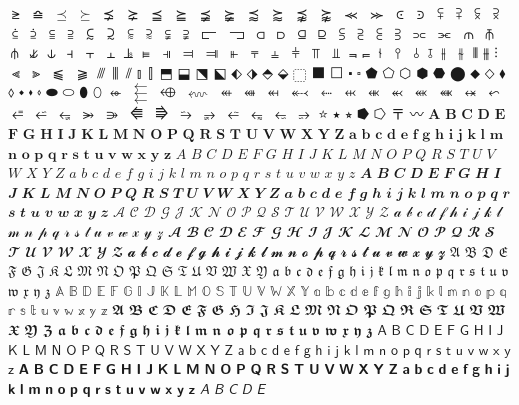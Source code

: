 $⪭$
$⪮$
$⪯$
$⪰$
$⪱$
$⪲$
$⪳$
$⪴$
$⪵$
$⪶$
$⪷$
$⪸$
$⪹$
$⪺$
$⪻$
$⪼$
$⪽$
$⪾$
$⪿$
$⫀$
$⫁$
$⫂$
$⫃$
$⫄$
$⫅$
$⫆$
$⫇$
$⫈$
$⫉$
$⫊$
$⫋$
$⫌$
$⫍$
$⫎$
$⫏$
$⫐$
$⫑$
$⫒$
$⫓$
$⫔$
$⫕$
$⫖$
$⫗$
$⫘$
$⫙$
$⫚$
$⫛$
$⫝̸$
$⫝$
$⫞$
$⫟$
$⫠$
$⫡$
$⫢$
$⫣$
$⫤$
$⫥$
$⫦$
$⫧$
$⫨$
$⫩$
$⫪$
$⫫$
$⫬$
$⫭$
$⫮$
$⫯$
$⫰$
$⫱$
$⫲$
$⫳$
$⫴$
$⫵$
$⫶$
$⫷$
$⫸$
$⫹$
$⫺$
$⫻$
$⫼$
$⫽$
$⫾$
$⫿$
$⬒$
$⬓$
$⬔$
$⬕$
$⬖$
$⬗$
$⬘$
$⬙$
$⬚$
$⬛$
$⬜$
$⬝$
$⬞$
$⬟$
$⬠$
$⬡$
$⬢$
$⬣$
$⬤$
$⬥$
$⬦$
$⬧$
$⬨$
$⬩$
$⬪$
$⬫$
$⬬$
$⬭$
$⬮$
$⬯$
$⬰$
$⬱$
$⬲$
$⬳$
$⬴$
$⬵$
$⬶$
$⬷$
$⬸$
$⬹$
$⬺$
$⬻$
$⬼$
$⬽$
$⬾$
$⬿$
$⭀$
$⭁$
$⭂$
$⭃$
$⭄$
$⭅$
$⭆$
$⭇$
$⭈$
$⭉$
$⭊$
$⭋$
$⭌$
$⭐$
$⭑$
$⭒$
$⭓$
$⭔$
$〒$
$〰$
$𝐀$
$𝐁$
$𝐂$
$𝐃$
$𝐄$
$𝐅$
$𝐆$
$𝐇$
$𝐈$
$𝐉$
$𝐊$
$𝐋$
$𝐌$
$𝐍$
$𝐎$
$𝐏$
$𝐐$
$𝐑$
$𝐒$
$𝐓$
$𝐔$
$𝐕$
$𝐖$
$𝐗$
$𝐘$
$𝐙$
$𝐚$
$𝐛$
$𝐜$
$𝐝$
$𝐞$
$𝐟$
$𝐠$
$𝐡$
$𝐢$
$𝐣$
$𝐤$
$𝐥$
$𝐦$
$𝐧$
$𝐨$
$𝐩$
$𝐪$
$𝐫$
$𝐬$
$𝐭$
$𝐮$
$𝐯$
$𝐰$
$𝐱$
$𝐲$
$𝐳$
$𝐴$
$𝐵$
$𝐶$
$𝐷$
$𝐸$
$𝐹$
$𝐺$
$𝐻$
$𝐼$
$𝐽$
$𝐾$
$𝐿$
$𝑀$
$𝑁$
$𝑂$
$𝑃$
$𝑄$
$𝑅$
$𝑆$
$𝑇$
$𝑈$
$𝑉$
$𝑊$
$𝑋$
$𝑌$
$𝑍$
$𝑎$
$𝑏$
$𝑐$
$𝑑$
$𝑒$
$𝑓$
$𝑔$
$𝑖$
$𝑗$
$𝑘$
$𝑙$
$𝑚$
$𝑛$
$𝑜$
$𝑝$
$𝑞$
$𝑟$
$𝑠$
$𝑡$
$𝑢$
$𝑣$
$𝑤$
$𝑥$
$𝑦$
$𝑧$
$𝑨$
$𝑩$
$𝑪$
$𝑫$
$𝑬$
$𝑭$
$𝑮$
$𝑯$
$𝑰$
$𝑱$
$𝑲$
$𝑳$
$𝑴$
$𝑵$
$𝑶$
$𝑷$
$𝑸$
$𝑹$
$𝑺$
$𝑻$
$𝑼$
$𝑽$
$𝑾$
$𝑿$
$𝒀$
$𝒁$
$𝒂$
$𝒃$
$𝒄$
$𝒅$
$𝒆$
$𝒇$
$𝒈$
$𝒉$
$𝒊$
$𝒋$
$𝒌$
$𝒍$
$𝒎$
$𝒏$
$𝒐$
$𝒑$
$𝒒$
$𝒓$
$𝒔$
$𝒕$
$𝒖$
$𝒗$
$𝒘$
$𝒙$
$𝒚$
$𝒛$
$𝒜$
$𝒞$
$𝒟$
$𝒢$
$𝒥$
$𝒦$
$𝒩$
$𝒪$
$𝒫$
$𝒬$
$𝒮$
$𝒯$
$𝒰$
$𝒱$
$𝒲$
$𝒳$
$𝒴$
$𝒵$
$𝒶$
$𝒷$
$𝒸$
$𝒹$
$𝒻$
$𝒽$
$𝒾$
$𝒿$
$𝓀$
$𝓁$
$𝓂$
$𝓃$
$𝓅$
$𝓆$
$𝓇$
$𝓈$
$𝓉$
$𝓊$
$𝓋$
$𝓌$
$𝓍$
$𝓎$
$𝓏$
$𝓐$
$𝓑$
$𝓒$
$𝓓$
$𝓔$
$𝓕$
$𝓖$
$𝓗$
$𝓘$
$𝓙$
$𝓚$
$𝓛$
$𝓜$
$𝓝$
$𝓞$
$𝓟$
$𝓠$
$𝓡$
$𝓢$
$𝓣$
$𝓤$
$𝓥$
$𝓦$
$𝓧$
$𝓨$
$𝓩$
$𝓪$
$𝓫$
$𝓬$
$𝓭$
$𝓮$
$𝓯$
$𝓰$
$𝓱$
$𝓲$
$𝓳$
$𝓴$
$𝓵$
$𝓶$
$𝓷$
$𝓸$
$𝓹$
$𝓺$
$𝓻$
$𝓼$
$𝓽$
$𝓾$
$𝓿$
$𝔀$
$𝔁$
$𝔂$
$𝔃$
$𝔄$
$𝔅$
$𝔇$
$𝔈$
$𝔉$
$𝔊$
$𝔍$
$𝔎$
$𝔏$
$𝔐$
$𝔑$
$𝔒$
$𝔓$
$𝔔$
$𝔖$
$𝔗$
$𝔘$
$𝔙$
$𝔚$
$𝔛$
$𝔜$
$𝔞$
$𝔟$
$𝔠$
$𝔡$
$𝔢$
$𝔣$
$𝔤$
$𝔥$
$𝔦$
$𝔧$
$𝔨$
$𝔩$
$𝔪$
$𝔫$
$𝔬$
$𝔭$
$𝔮$
$𝔯$
$𝔰$
$𝔱$
$𝔲$
$𝔳$
$𝔴$
$𝔵$
$𝔶$
$𝔷$
$𝔸$
$𝔹$
$𝔻$
$𝔼$
$𝔽$
$𝔾$
$𝕀$
$𝕁$
$𝕂$
$𝕃$
$𝕄$
$𝕆$
$𝕊$
$𝕋$
$𝕌$
$𝕍$
$𝕎$
$𝕏$
$𝕐$
$𝕒$
$𝕓$
$𝕔$
$𝕕$
$𝕖$
$𝕗$
$𝕘$
$𝕙$
$𝕚$
$𝕛$
$𝕜$
$𝕝$
$𝕞$
$𝕟$
$𝕠$
$𝕡$
$𝕢$
$𝕣$
$𝕤$
$𝕥$
$𝕦$
$𝕧$
$𝕨$
$𝕩$
$𝕪$
$𝕫$
$𝕬$
$𝕭$
$𝕮$
$𝕯$
$𝕰$
$𝕱$
$𝕲$
$𝕳$
$𝕴$
$𝕵$
$𝕶$
$𝕷$
$𝕸$
$𝕹$
$𝕺$
$𝕻$
$𝕼$
$𝕽$
$𝕾$
$𝕿$
$𝖀$
$𝖁$
$𝖂$
$𝖃$
$𝖄$
$𝖅$
$𝖆$
$𝖇$
$𝖈$
$𝖉$
$𝖊$
$𝖋$
$𝖌$
$𝖍$
$𝖎$
$𝖏$
$𝖐$
$𝖑$
$𝖒$
$𝖓$
$𝖔$
$𝖕$
$𝖖$
$𝖗$
$𝖘$
$𝖙$
$𝖚$
$𝖛$
$𝖜$
$𝖝$
$𝖞$
$𝖟$
$𝖠$
$𝖡$
$𝖢$
$𝖣$
$𝖤$
$𝖥$
$𝖦$
$𝖧$
$𝖨$
$𝖩$
$𝖪$
$𝖫$
$𝖬$
$𝖭$
$𝖮$
$𝖯$
$𝖰$
$𝖱$
$𝖲$
$𝖳$
$𝖴$
$𝖵$
$𝖶$
$𝖷$
$𝖸$
$𝖹$
$𝖺$
$𝖻$
$𝖼$
$𝖽$
$𝖾$
$𝖿$
$𝗀$
$𝗁$
$𝗂$
$𝗃$
$𝗄$
$𝗅$
$𝗆$
$𝗇$
$𝗈$
$𝗉$
$𝗊$
$𝗋$
$𝗌$
$𝗍$
$𝗎$
$𝗏$
$𝗐$
$𝗑$
$𝗒$
$𝗓$
$𝗔$
$𝗕$
$𝗖$
$𝗗$
$𝗘$
$𝗙$
$𝗚$
$𝗛$
$𝗜$
$𝗝$
$𝗞$
$𝗟$
$𝗠$
$𝗡$
$𝗢$
$𝗣$
$𝗤$
$𝗥$
$𝗦$
$𝗧$
$𝗨$
$𝗩$
$𝗪$
$𝗫$
$𝗬$
$𝗭$
$𝗮$
$𝗯$
$𝗰$
$𝗱$
$𝗲$
$𝗳$
$𝗴$
$𝗵$
$𝗶$
$𝗷$
$𝗸$
$𝗹$
$𝗺$
$𝗻$
$𝗼$
$𝗽$
$𝗾$
$𝗿$
$𝘀$
$𝘁$
$𝘂$
$𝘃$
$𝘄$
$𝘅$
$𝘆$
$𝘇$
$𝘈$
$𝘉$
$𝘊$
$𝘋$
$𝘌$
